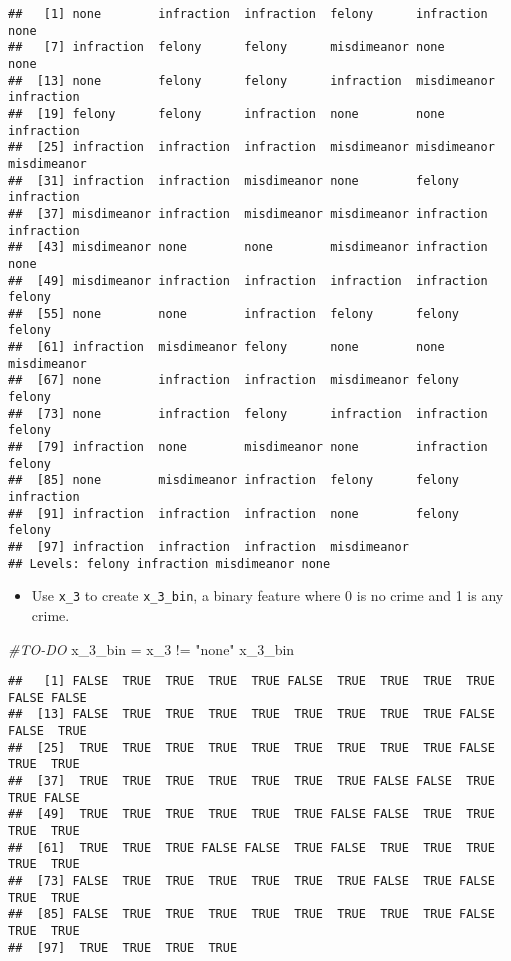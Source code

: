 \documentclass[
]{article}
\newenvironment{Shaded}{\begin{snugshade}}{\end{snugshade}}
\newcommand{\CommentTok}[1]{\textcolor[rgb]{0.56,0.35,0.01}{\textit{#1}}}
\newcommand{\NormalTok}[1]{#1}
\newcommand{\OtherTok}[1]{\textcolor[rgb]{0.56,0.35,0.01}{#1}}
\newcommand{\SpecialCharTok}[1]{\textcolor[rgb]{0.00,0.00,0.00}{#1}}
\newcommand{\StringTok}[1]{\textcolor[rgb]{0.31,0.60,0.02}{#1}}
\providecommand{\tightlist}{%
  \setlength{\itemsep}{0pt}\setlength{\parskip}{0pt}}
\begin{document}
\begin{verbatim}
##   [1] none        infraction  infraction  felony      infraction  none       
##   [7] infraction  felony      felony      misdimeanor none        none       
##  [13] none        felony      felony      infraction  misdimeanor infraction 
##  [19] felony      felony      infraction  none        none        infraction 
##  [25] infraction  infraction  infraction  misdimeanor misdimeanor misdimeanor
##  [31] infraction  infraction  misdimeanor none        felony      infraction 
##  [37] misdimeanor infraction  misdimeanor misdimeanor infraction  infraction 
##  [43] misdimeanor none        none        misdimeanor infraction  none       
##  [49] misdimeanor infraction  infraction  infraction  infraction  felony     
##  [55] none        none        infraction  felony      felony      felony     
##  [61] infraction  misdimeanor felony      none        none        misdimeanor
##  [67] none        infraction  infraction  misdimeanor felony      felony     
##  [73] none        infraction  felony      infraction  infraction  felony     
##  [79] infraction  none        misdimeanor none        infraction  felony     
##  [85] none        misdimeanor infraction  felony      felony      infraction 
##  [91] infraction  infraction  infraction  none        felony      felony     
##  [97] infraction  infraction  infraction  misdimeanor
## Levels: felony infraction misdimeanor none
\end{verbatim}

\begin{itemize}
\tightlist
\item
  Use \texttt{x\_3} to create \texttt{x\_3\_bin}, a binary feature where
  0 is no crime and 1 is any crime.
\end{itemize}

\begin{Shaded}
\begin{Highlighting}[]
\CommentTok{\#TO{-}DO}
\NormalTok{x\_3\_bin }\OtherTok{=}\NormalTok{ x\_3 }\SpecialCharTok{!=} \StringTok{"none"}
\NormalTok{x\_3\_bin}
\end{Highlighting}
\end{Shaded}

\begin{verbatim}
##   [1] FALSE  TRUE  TRUE  TRUE  TRUE FALSE  TRUE  TRUE  TRUE  TRUE FALSE FALSE
##  [13] FALSE  TRUE  TRUE  TRUE  TRUE  TRUE  TRUE  TRUE  TRUE FALSE FALSE  TRUE
##  [25]  TRUE  TRUE  TRUE  TRUE  TRUE  TRUE  TRUE  TRUE  TRUE FALSE  TRUE  TRUE
##  [37]  TRUE  TRUE  TRUE  TRUE  TRUE  TRUE  TRUE FALSE FALSE  TRUE  TRUE FALSE
##  [49]  TRUE  TRUE  TRUE  TRUE  TRUE  TRUE FALSE FALSE  TRUE  TRUE  TRUE  TRUE
##  [61]  TRUE  TRUE  TRUE FALSE FALSE  TRUE FALSE  TRUE  TRUE  TRUE  TRUE  TRUE
##  [73] FALSE  TRUE  TRUE  TRUE  TRUE  TRUE  TRUE FALSE  TRUE FALSE  TRUE  TRUE
##  [85] FALSE  TRUE  TRUE  TRUE  TRUE  TRUE  TRUE  TRUE  TRUE FALSE  TRUE  TRUE
##  [97]  TRUE  TRUE  TRUE  TRUE
\end{verbatim}
\end{document}

